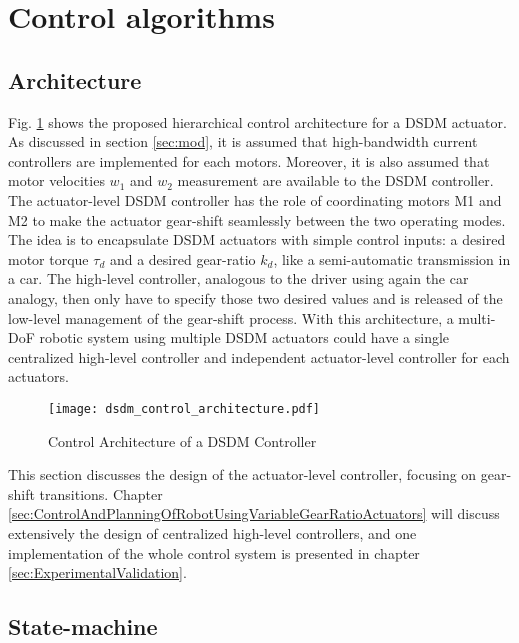 
\newpage

\section{Control algorithms}

\subsection{Architecture}

Fig. \ref{fig:dsdm_control_architecture} shows the proposed hierarchical control architecture for a DSDM actuator. As discussed in section \ref{sec:mod}, it is assumed that high-bandwidth current controllers are implemented for each motors. Moreover, it is also assumed that motor velocities $w_1$ and $w_2$ measurement are available to the DSDM controller. The actuator-level DSDM controller has the role of coordinating motors M1 and M2 to make the actuator gear-shift seamlessly between the two operating modes. The idea is to encapsulate DSDM actuators with simple control inputs: a desired motor torque $\tau_d$ and a desired gear-ratio $k_d$, like a semi-automatic transmission in a car. The high-level controller, analogous to the driver using again the car analogy, then only have to specify those two desired values and is released of the low-level management of the gear-shift process. With this architecture, a multi-DoF robotic system using multiple DSDM actuators could have a single centralized high-level controller and independent actuator-level controller for each actuators. 

\begin{figure}[H]
	\centering
		\texttt{[image: dsdm\_control\_architecture.pdf]}
	\caption{Control Architecture of a DSDM Controller}
	\label{fig:dsdm_control_architecture}
\end{figure}

This section discusses the design of the actuator-level controller, focusing on gear-shift transitions. Chapter \ref{sec:ControlAndPlanningOfRobotUsingVariableGearRatioActuators} will discuss extensively the design of centralized high-level controllers, and one implementation of the whole control system is presented in chapter \ref{sec:ExperimentalValidation}.


\subsection{State-machine}

